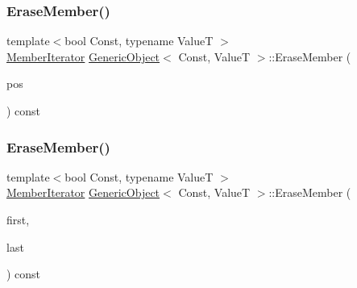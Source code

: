 \mbox{\label{classGenericObject_a29ad0490a4a088d57df7a9884f979a82}} 
\subsubsection{\texorpdfstring{Erase\+Member()}{EraseMember()}\hspace{0.1cm}{\footnotesize\ttfamily [1/4]}}
{\footnotesize\ttfamily template$<$bool Const, typename ValueT $>$ \\
\hyperlink{classGenericObject_a1f531d70f8d57ed30199ac445b5935e6}{Member\+Iterator} \hyperlink{classGenericObject}{Generic\+Object}$<$ Const, ValueT $>$\+::Erase\+Member (\begin{DoxyParamCaption}\item[{\hyperlink{classGenericObject_af16706c0ad32b957c56e7d0541628cd5}{Const\+Member\+Iterator}}]{pos }\end{DoxyParamCaption}) const\hspace{0.3cm}{\ttfamily [inline]}}

\mbox{\label{classGenericObject_a67f85d2da462287dead8e35f2ac974b5}} 
\subsubsection{\texorpdfstring{Erase\+Member()}{EraseMember()}\hspace{0.1cm}{\footnotesize\ttfamily [2/4]}}
{\footnotesize\ttfamily template$<$bool Const, typename ValueT $>$ \\
\hyperlink{classGenericObject_a1f531d70f8d57ed30199ac445b5935e6}{Member\+Iterator} \hyperlink{classGenericObject}{Generic\+Object}$<$ Const, ValueT $>$\+::Erase\+Member (\begin{DoxyParamCaption}\item[{\hyperlink{classGenericObject_af16706c0ad32b957c56e7d0541628cd5}{Const\+Member\+Iterator}}]{first,  }\item[{\hyperlink{classGenericObject_af16706c0ad32b957c56e7d0541628cd5}{Const\+Member\+Iterator}}]{last }\end{DoxyParamCaption}) const\hspace{0.3cm}{\ttfamily [inline]}}

